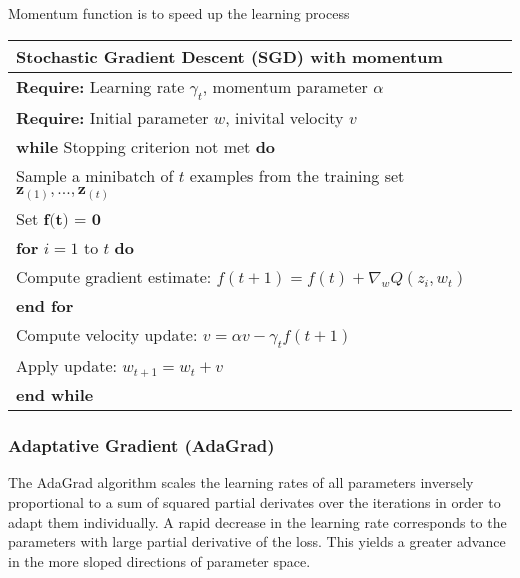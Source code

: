Momentum function is to speed up the learning process 

\begin{center}
\begin{tabular}{| l |}
\hline
 \textbf{Stochastic Gradient Descent (SGD) with momentum}\\ 
\hline
 \textbf{Require:} Learning rate $\gamma_t$, momentum parameter $\alpha$\\
 \textbf{Require:} Initial parameter $w$, inivital velocity $v$\\
 \hspace{1cm} \textbf{while} Stopping criterion not met \textbf{do}\\
 \hspace{2cm} Sample a minibatch of $t$ examples from the training set  $\textbf{z}_{(1)} ,...,        \textbf{z}_{(t)}$ \\
 \hspace{2cm} Set $\textbf{f(t) = 0}$\\
 \hspace{2cm} \textbf{for} $i=1$ to $t$ \textbf{do}\\
 \hspace{3cm} Compute gradient estimate: $f(t+1) = f(t) + \nabla_w Q(z_i,w_t) $\\
 \hspace{2cm} \textbf{end for}\\ 
 \hspace{2cm} Compute velocity update: \textbf{$v = \alpha v-\gamma_t f(t+1)$}\\
 \hspace{2cm} Apply update: \textbf{$w_{t+1} = w_t + v$}\\
 \hspace{1cm} \textbf{end while}\\
\hline
\end{tabular}
\end{center}



\subsubsection{Adaptative Gradient (AdaGrad)}
\label{subsub:AdaGrad}

The AdaGrad algorithm scales the learning rates of all parameters inversely proportional to a sum of squared partial derivates over the iterations in order to adapt them individually.  A rapid decrease in the learning rate corresponds to the parameters with large partial derivative of the loss. This yields a greater advance in the more sloped directions of parameter space.

